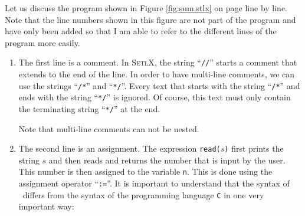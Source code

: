 Let us discuss the program shown in Figure \ref{fig:sum.stlx} on page \pageref{fig:sum.stlx} line by line.
Note that the line numbers shown in this figure are not part of the program and have only been added
so that I am able to refer to the different lines of the program more easily.
\begin{enumerate}
\item The first line is a comment.  In \textsc{SetlX}, the string  ``\texttt{//}'' starts a comment
      that extends to the end of the line.  In order to have multi-line comments, we can use the 
      strings ``\texttt{/*}'' and ``\texttt{*/}''.  Every text that starts with the string ``\texttt{/*}''
      and ends with the string ``\texttt{*/}'' is ignored.  Of course, this text must only contain the
      terminating string ``\texttt{*/}'' at the end.

      Note that multi-line comments can not be nested.
\item The second line is an assignment.  The expression  \texttt{read($s$)}
      first prints the string $s$ and then reads and returns the number that is input by the user.
      This number is then assigned to the variable \texttt{n}.  This is done using the assignment operator
      ``\texttt{:=}''.  It is important to understand that the syntax of \setl\ differs from the
      syntax of the programming language \texttt{C} in one very important way:

      \begin{center}
      \colorbox{red}{}
      \end{center}      


\end{enumerate}
